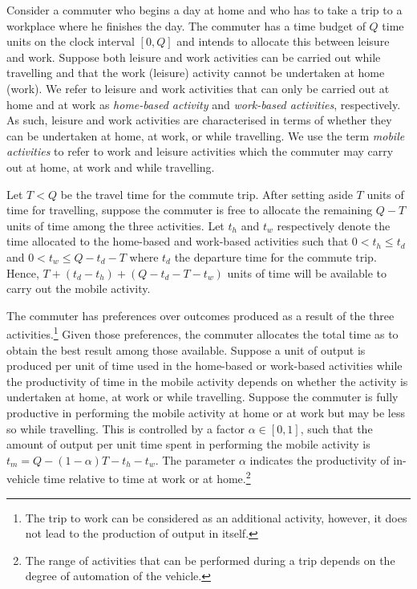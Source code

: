 \documentclass[12pt,a4paper,british]{article}
\begin{document}
Consider a commuter who begins a day at home and who has to take a trip to a workplace where he finishes the day. The commuter has a time budget of $Q$ time units on the clock interval $[0, Q]$ and intends to allocate this between leisure and work. Suppose both leisure and work activities can be carried out while travelling and that the work (leisure) activity cannot be undertaken at home (work). We refer to leisure and work activities that can only be carried out at home and at work as \emph{home-based activity} and \emph{work-based activities}, respectively. As such, leisure and work activities are characterised in terms of whether they can be undertaken at home, at work, or while travelling. We use the term \textit{mobile activities} to refer to work and leisure activities which the commuter may carry out at home, at work and while travelling.

Let $T<Q$ be the travel time for the commute trip. After setting aside $T$ units of time for travelling, suppose the commuter is free to allocate the remaining $Q-T$ units of time among the three activities. Let $t_{h}$ and $t_{w}$ respectively denote the time allocated to the home-based and work-based activities such that $0<t_{h}\leq t_{d}$ and $0<t_{w}\leq Q-t_{d}-T$ where $t_d$ the departure time for the commute trip. Hence,  $T+\left(t_{d}-t_{h}\right)+\left(Q-t_{d}-T-t_{w}\right)$ units of time will be available to carry out the mobile activity. 


The commuter has preferences over outcomes produced as a result of the three activities.\footnote{The trip to work can be considered as an additional activity, however, it does not lead to the production of output in itself.} Given those preferences, the commuter allocates the total time as to obtain the best result among those available. Suppose a unit of output is produced per unit of time used in the home-based or work-based activities while the productivity of time in the mobile activity depends on whether the activity is undertaken at home, at work or while travelling. Suppose the commuter is fully productive in performing the mobile activity at home or at work but may be less so while travelling. This is controlled by a factor $\alpha \in \left[0, 1\right]$, such that the amount of output per unit time spent in performing the mobile activity is $t_{m} = Q - \left( 1 - \alpha \right) T - t_{h}-t_{w}$. The parameter $\alpha$ indicates the productivity of in-vehicle time relative to time at work or at home.\footnote{The range of activities that can be performed during a trip depends on the degree of automation of the vehicle.}
\end{document}
